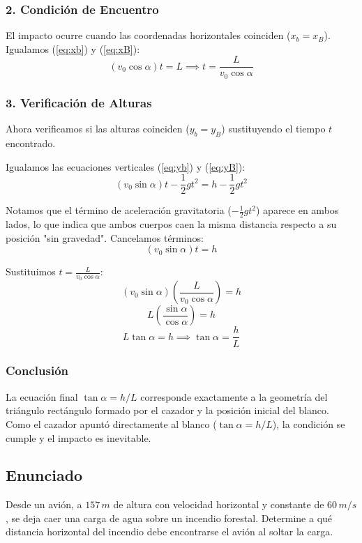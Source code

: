 \documentclass[12pt, a4paper]{article}
\begin{document}
\subsubsection*{2. Condición de Encuentro}
El impacto ocurre cuando las coordenadas horizontales coinciden ($x_b = x_B$). Igualamos (\ref{eq:xb}) y (\ref{eq:xB}):
$$ (v_0 \cos\alpha) t = L \implies t = \frac{L}{v_0 \cos\alpha} $$

\subsubsection*{3. Verificación de Alturas}
Ahora verificamos si las alturas coinciden ($y_b = y_B$) sustituyendo el tiempo $t$ encontrado.

Igualamos las ecuaciones verticales (\ref{eq:yb}) y (\ref{eq:yB}):
$$ (v_0 \sin\alpha) t - \frac{1}{2} g t^2 = h - \frac{1}{2} g t^2 $$

Notamos que el término de aceleración gravitatoria ($-\frac{1}{2}gt^2$) aparece en ambos lados, lo que indica que ambos cuerpos caen la misma distancia respecto a su posición "sin gravedad". Cancelamos términos:
$$ (v_0 \sin\alpha) t = h $$

Sustituimos $t = \frac{L}{v_0 \cos\alpha}$:
$$ (v_0 \sin\alpha) \left( \frac{L}{v_0 \cos\alpha} \right) = h $$
$$ L \left( \frac{\sin\alpha}{\cos\alpha} \right) = h $$
$$ L \tan\alpha = h \implies \boxed{\tan\alpha = \frac{h}{L}} $$

\subsubsection*{Conclusión}
La ecuación final $\tan\alpha = h/L$ corresponde exactamente a la geometría del triángulo rectángulo formado por el cazador y la posición inicial del blanco. Como el cazador apuntó directamente al blanco ($\tan\alpha = h/L$), la condición se cumple y el impacto es inevitable.

\newpage

\subsection*{Enunciado}
Desde un avión, a $157 \, \si{m}$ de altura con velocidad horizontal y constante de $60 \, \si{m/s}$, se deja caer una carga de agua sobre un incendio forestal. Determine a qué distancia horizontal del incendio debe encontrarse el avión al soltar la carga.
\end{document}
